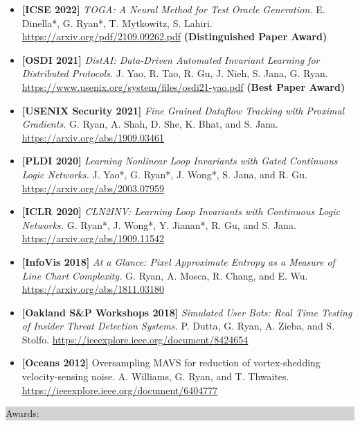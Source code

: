 \documentclass{article} %
\newcommand{\rsection}[1]{
  \hspace{-0.4cm}\vspace{0.1cm}
\colorbox{lightgrey}{
\begin{minipage}{1.07\linewidth}
\vspace{0.22cm}
\fontsize{14pt}{16pt}\selectfont #1
\vspace{0.12cm}
\end{minipage}
}
\vspace*{-0.1cm}
}
\begin{document}
\begin{minipage}{1.01\linewidth}
\begin{itemize}[label={},itemindent=-2em,leftmargin=2em, parsep=5pt]
  \item {\bf [ICSE 2022]}
    \textit{TOGA: A Neural Method for Test Oracle Generation.}
    E. Dinella*, G. Ryan*, T. Mytkowitz, S. Lahiri. \url{https://arxiv.org/pdf/2109.09262.pdf} \textbf{(Distinguished Paper Award)}
  \item {\bf [OSDI 2021]}
    \textit{DistAI: Data-Driven Automated Invariant Learning for Distributed Protocols.}
    J. Yao, R. Tao, R. Gu, J. Nieh, S. Jana, G. Ryan. \url{https://www.usenix.org/system/files/osdi21-yao.pdf} \textbf{(Best Paper Award)}
  \item {\bf [USENIX Security 2021]}
    \textit{Fine Grained Dataflow Tracking with Proximal Gradients.}
    G. Ryan, A. Shah, D. She, K. Bhat, and S. Jana. \url{https://arxiv.org/abs/1909.03461}
  \item {\bf [PLDI 2020]}
    \textit{Learning Nonlinear Loop Invariants with Gated Continuous Logic Networks.}
    J. Yao*, G. Ryan*, J. Wong*, S. Jana, and R. Gu. \url{https://arxiv.org/abs/2003.07959}
  \item {\bf [ICLR 2020]}
    \textit{CLN2INV: Learning Loop Invariants with Continuous Logic Networks.}
    G. Ryan*, J. Wong*, Y. Jianan*, R. Gu, and S. Jana. \url{https://arxiv.org/abs/1909.11542}
  \item {\bf [InfoVis 2018]}
    \textit{At a Glance: Pixel Approximate Entropy as a Measure of Line Chart Complexity.}
    G. Ryan, A. Mosca, R. Chang, and E. Wu. \url{https://arxiv.org/abs/1811.03180}
  \item  {\bf [Oakland S\&P Workshops 2018]}
    \textit{Simulated User Bots: Real Time Testing of Insider Threat Detection Systems.}
    P. Dutta, G. Ryan, A. Zieba, and S. Stolfo. \url{https://ieeexplore.ieee.org/document/8424654}
  \item  {\bf [Oceans 2012]} \textrm{\fontsize{11pt}{12pt}\selectfont Oversampling MAVS for reduction of vortex-shedding velocity-sensing noise.} A. Williams, G. Ryan, and T. Thwaites. \url{https://ieeexplore.ieee.org/document/6404777}
\end{itemize}
\end{minipage}


\vspace{0.2cm}
\rsection{Awards:}
\hspace*{-0.1cm}
\end{document}
